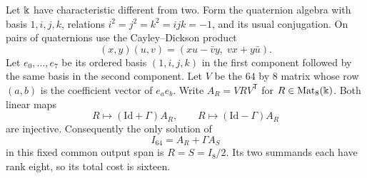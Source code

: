 \begin{proposition}
\label{prop:octonion-fixed-span}
Let $\Bbbk$ have characteristic different from two. Form the
quaternion algebra with basis $1,i,j,k$, relations
$i^2=j^2=k^2=ijk=-1$, and its usual conjugation. On pairs of
quaternions use the Cayley--Dickson product
\[
 (x,y)(u,v)=(xu-\bar v y,\;vx+y\bar u).
\]
Let $e_0,\ldots,e_7$ be its ordered basis
$(1,i,j,k)$ in the first component followed by the same basis
in the second component. Let $V$ be the $64$ by $8$ matrix
whose row $(a,b)$ is the coefficient vector of $e_ae_b$.
Write $A_R=VRV^{\mathsf T}$ for $R\in\operatorname{Mat}_8(\Bbbk)$.
Both linear maps
\[
 R\longmapsto (\mathrm{Id}+\Gamma)A_R,
 \qquad R\longmapsto(\mathrm{Id}-\Gamma)A_R
\]
are injective. Consequently the only solution of
\[
 I_{64}=A_R+\Gamma A_S
\]
in this fixed common output span is $R=S=I_8/2$.
Its two summands each have rank eight, so its total cost is sixteen.
\end{proposition}
